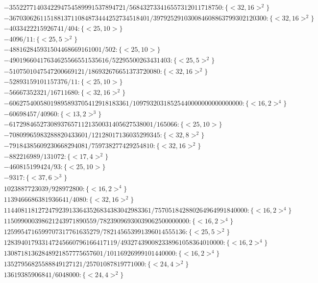 \documentclass[11pt,reqno]{amsart}
\theoremstyle{plain}
\theoremstyle{definition}
\begin{document}
{\begin{align*}
&-3552277140342294754589991537894721/568432733416557312011718750:\{ <32, 16>^2 \}\\
&-36703062611518813711084873444252734518401/397925291030084608863799302120300:\{ <32, 16>^2 \}\\
&-4033422215926741/404:\{ <25, 10> \}\\
&-4096/11:\{ <25, 5>^2 \}\\
&-488162845931504468669161001/502:\{<25, 10> \}\\
&-49019660417634625566551535616/52295500263431403:\{ <25, 5>^2 \}\\
&-5107501047547200669121/186932676651373720080:\{ <32, 16>^2 \}\\
&-52893159101157376/11:\{ <25, 10> \}\\
&-56667352321/16711680:\{ <32, 16>^2 \}\\
&-60627540058019895893705412918183361/10979320318525440000000000000000:\{ <16, 2>^4 \}\\
&-60698457/40960:\{ <13, 2>^3 \}\\
&-617298465273089376571121350031405627538001/165066:\{ <25, 10> \}\\
&-70809965983288820433601/12128017136035299345:\{ <32, 8>^2 \}\\
&-79184385609230668294081/759738277429254810:\{ <32, 16>^2 \}
\end{align*}
\begin{align*}
&-882216989/131072: \{ <17, 4>^2\}\\
&-460815199424/93:\{ <25, 10> \}\\
&-9317:\{ <37, 6>^3 \}\\
&1023887723039/928972800:\{ <16, 2>^4 \}\\
&1139466686381936641/4080:\{ <32, 16>^2 \}\\
&1144081181272479239133643526834383042983361/757051842880264964991840000:\{ <16, 2>^4 \}\\
&115099000398621243971890559/78239096930039062500000000:\{ <16, 2>^4 \}\\
&1259954716599707317761635279/782145653991396014555136:\{ <25, 5>^2 \}\\
&128394017933147245660796166417119/493274390082338961058364010000:\{ <16, 2>^4 \}\\
&13087181362848921857775657601/10116926999101440000:\{ <16, 2>^4 \}\\
&13527956825588849127121/25701087819771000:\{ <24, 4>^2 \}\\
&13619385906841/6048000:\{ <24, 4>^2 \}\\

\end{align*}}
\end{document}
